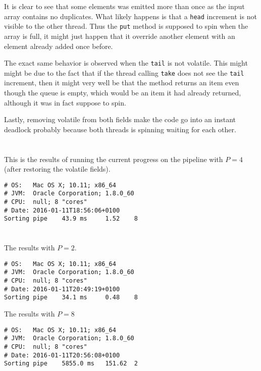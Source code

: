 \documentclass{ituhandin}
\begin{document}
It is clear to see that some elements was emitted more than once as the input array contains no duplicates. What likely happens is that a \texttt{head} increment is not visible to the other thread. Thus the \texttt{put} method is supposed to spin when the array is full, it might just happen that it override another element with an element already added once before.

The exact same behavior is observed when the \texttt{tail} is not volatile. This might might be due to the fact that if the thread calling \texttt{take} does not see the \texttt{tail} increment, then it might very well be that the method returns an item even though the queue is empty, which would be an item it had already returned, although it was in fact suppose to spin.

Lastly, removing volatile from both fields make the code go into an instant deadlock probably because both threads is spinning waiting for each other.


\section{} %

This is the results of running the current progress on the pipeline with $P=4$ (after restoring the volatile fields).
\begin{lstlisting}[language={},frame={}]
# OS:   Mac OS X; 10.11; x86_64
# JVM:  Oracle Corporation; 1.8.0_60
# CPU:  null; 8 "cores"
# Date: 2016-01-11T18:56:06+0100
Sorting pipe    43.9 ms     1.52    8
\end{lstlisting}
\section{} %


The results with $P = 2$.
\begin{lstlisting}[language={},frame={}, gobble=2]
# OS:   Mac OS X; 10.11; x86_64
# JVM:  Oracle Corporation; 1.8.0_60
# CPU:  null; 8 "cores"
# Date: 2016-01-11T20:49:19+0100
Sorting pipe    34.1 ms     0.48    8
\end{lstlisting}


The results with $P = 8$
\begin{lstlisting}[language={},frame={}]
# OS:   Mac OS X; 10.11; x86_64
# JVM:  Oracle Corporation; 1.8.0_60
# CPU:  null; 8 "cores"
# Date: 2016-01-11T20:56:08+0100
Sorting pipe    5855.0 ms   151.62  2
\end{lstlisting}
\end{document}
